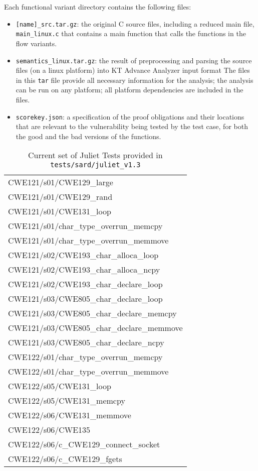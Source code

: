 \documentclass[11pt]{article}
\begin{document}
Each functional variant directory contains the following files:
\begin{itemize}[leftmargin=*]
\item {\tt [name]\_src.tar.gz}: the original C source files, including a reduced main file,
{\tt main\_linux.c} that contains a main function that calls the functions in
the flow variants.
\item {\tt semantics\_linux.tar.gz}: the result of preprocessing and parsing the source 
  files (on a linux platform) into KT Advance Analyzer input format
  The files in this {\tt tar} file provide all necessary information for the analysis; 
  the analysis can be run on any platform; all platform dependencies are included 
  in the files.
\item {\tt scorekey.json}: a specification of the proof obligations and their locations
  that are relevant to the vulnerability being tested by the test case, for both the
  good and the bad versions of the functions.
\end{itemize}

\begin{table}
\centering
\begin{tabular}{|l|}  \hline
  CWE121/s01/CWE129\_large  \\                
  CWE121/s01/CWE129\_rand  \\                 
  CWE121/s01/CWE131\_loop   \\                 
  CWE121/s01/char\_type\_overrun\_memcpy  \\    
  CWE121/s01/char\_type\_overrun\_memmove \\   
  CWE121/s02/CWE193\_char\_alloca\_loop  \\    
  CWE121/s02/CWE193\_char\_alloca\_ncpy  \\    
  CWE121/s02/CWE193\_char\_declare\_loop  \\   
  CWE121/s03/CWE805\_char\_declare\_loop  \\   
  CWE121/s03/CWE805\_char\_declare\_memcpy \\  
  CWE121/s03/CWE805\_char\_declare\_memmove  \\
  CWE121/s03/CWE805\_char\_declare\_ncpy  \\   
  CWE122/s01/char\_type\_overrun\_memcpy \\    
  CWE122/s01/char\_type\_overrun\_memmove \\   
  CWE122/s05/CWE131\_loop \\                 
  CWE122/s05/CWE131\_memcpy \\               
  CWE122/s06/CWE131\_memmove \\              
  CWE122/s06/CWE135  \\                     
  CWE122/s06/c\_CWE129\_connect\_socket \\     
  CWE122/s06/c\_CWE129\_fgets \\ \hline             
\end{tabular}
\caption{\label{tab:juliet} Current set of Juliet Tests provided in {\tt tests/sard/juliet\_v1.3}}
\end{table}
\end{document}

